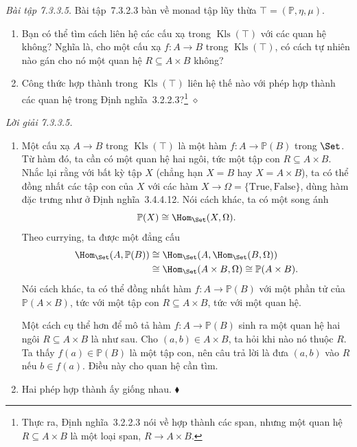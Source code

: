 \noindent\textit{Bài tập 7.3.3.5.}\keepwithnext
Bài tập~7.3.2.3 bàn về monad tập lũy thừa $\top=(\mathbb P,\eta,\mu)$.
\begin{enumerate}[label=\alph*.]
\item Bạn có thể tìm cách liên hệ các cấu xạ trong $\operatorname{Kls}(\top)$ với các quan hệ không? Nghĩa là, cho một cấu xạ $f:A\to B$ trong $\operatorname{Kls}(\top)$, có cách tự nhiên nào gán cho nó một quan hệ $R\subseteq A\times B$ không?
\item Công thức hợp thành trong $\operatorname{Kls}(\top)$ liên hệ thế nào với phép hợp thành các quan hệ trong Định nghĩa~3.2.2.3?\footnote{Thực ra, Định nghĩa~3.2.2.3 nói về hợp thành các span, nhưng một quan hệ $R\subseteq A\times B$ là một loại span, $R\to A\times B$.}
\nobreak\hfill$\diamond$
\end{enumerate}

\noindent\textit{Lời giải 7.3.3.5.}\keepwithnext
\begin{enumerate}[label=\alph*.]
\item Một cấu xạ $A\to B$ trong $\operatorname{Kls}(\top)$ là một hàm $f:A\to\mathbb P(B)$ trong $\Set$. Từ hàm đó, ta cần có một quan hệ hai ngôi, tức một tập con $R\subseteq A\times B$. Nhắc lại rằng với bất kỳ tập $X$ (chẳng hạn $X=B$ hay $X=A\times B$), ta có thể đồng nhất các tập con của $X$ với các hàm $X\to\Omega=\{\mathrm{True},\mathrm{False}\}$, dùng hàm đặc trưng như ở Định nghĩa~3.4.4.12. Nói cách khác, ta có một song ánh
\[
\mathbb P(X)\cong\Hom_{\Set}(X,\Omega).
\]
Theo currying, ta được một đẳng cấu
\[
\begin{aligned}
\Hom_{\Set}(A,\mathbb P(B))&\cong\Hom_{\Set}(A,\Hom_{\Set}(B,\Omega))\\
&\cong\Hom_{\Set}(A\times B,\Omega)\cong\mathbb P(A\times B).
\end{aligned}
\]
Nói cách khác, ta có thể đồng nhất hàm $f:A\to\mathbb P(B)$ với một phần tử của $\mathbb P(A\times B)$, tức với một tập con $R\subseteq A\times B$, tức với một quan hệ.

Một cách cụ thể hơn để mô tả hàm $f:A\to\mathbb P(B)$ sinh ra một quan hệ hai ngôi $R\subseteq A\times B$ là như sau. Cho $(a,b)\in A\times B$, ta hỏi khi nào nó thuộc $R$. Ta thấy $f(a)\in\mathbb P(B)$ là một tập con, nên câu trả lời là đưa $(a,b)$ vào $R$ nếu $b\in f(a)$. Điều này cho quan hệ cần tìm.
\item Hai phép hợp thành ấy giống nhau.
\nobreak\hfill$\blacklozenge$
\end{enumerate}

